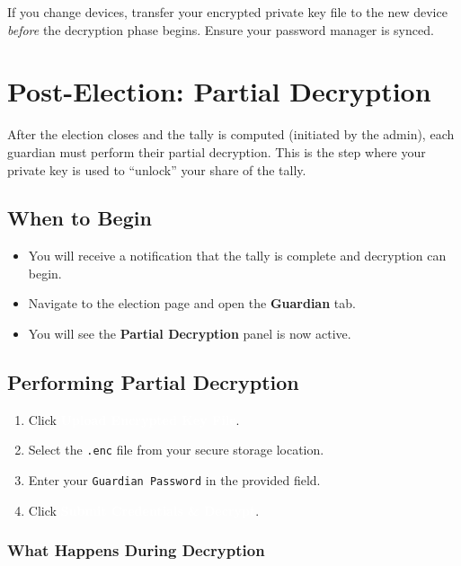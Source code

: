 \documentclass[12pt,a4paper]{book}
\newcommand{\uibutton}[1]{\colorbox{guardgreen}{\textcolor{white}{\small\textbf{#1}}}}
\newcommand{\uifield}[1]{\texttt{\color{guardaccent}#1}}
\newcommand{\uimenu}[1]{\textbf{\color{guardgreen}#1}}
\begin{document}
\begin{tcolorbox}[warnbox]
If you change devices, transfer your encrypted private key file to the new device \emph{before} the decryption phase begins. Ensure your password manager is synced.
\end{tcolorbox}

\chapter{Post-Election: Partial Decryption}
\label{ch:guard-decrypt}

After the election closes and the tally is computed (initiated by the admin), each guardian must perform their partial decryption. This is the step where your private key is used to ``unlock'' your share of the tally.

\section{When to Begin}

\begin{itemize}
  \item You will receive a notification that the tally is complete and decryption can begin.
  \item Navigate to the election page and open the \uimenu{Guardian} tab.
  \item You will see the \textbf{Partial Decryption} panel is now active.
\end{itemize}

\section{Performing Partial Decryption}

\begin{enumerate}
  \item Click \uibutton{Upload Encrypted Key File}.
  \item Select the \texttt{.enc} file from your secure storage location.
  \item Enter your \uifield{Guardian Password} in the provided field.
  \item Click \uibutton{Submit Credentials \& Decrypt}.
\end{enumerate}

\subsection{What Happens During Decryption}
\end{document}
